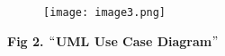 \documentclass[12pt]{article}
\begin{document}

\begin{figure}[H]
	\begin{Center}
		\texttt{[image: image3.png]}
	\end{Center}
\end{figure}



\par

\begin{Center}
\textbf{Fig 2. $``$UML Use Case Diagram$"$ }
\end{Center}\par


\vspace{\baselineskip}
\end{document}
